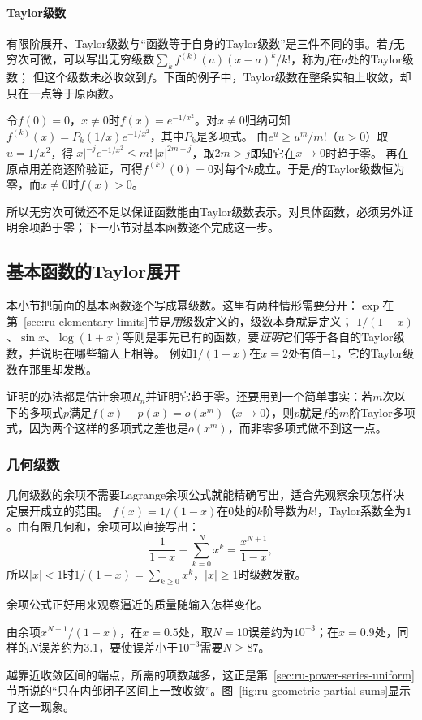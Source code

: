 \paragraph{Taylor级数}
有限阶展开、Taylor级数与“函数等于自身的Taylor级数”是三件不同的事。若$f$无穷次可微，可以写出无穷级数$\sum_kf^{(k)}(a)(x-a)^k/k!$，称为$f$在$a$处的Taylor级数；
但这个级数未必收敛到$f$。下面的例子中，Taylor级数在整条实轴上收敛，却只在一点等于原函数。
\begin{example}[光滑但不等于自身Taylor级数的函数]
\label{ex:ru-smooth-not-analytic}
令$f(0)=0$，$x\neq0$时$f(x)=e^{-1/x^2}$。对$x\neq0$归纳可知$f^{(k)}(x)=P_k(1/x)e^{-1/x^2}$，其中$P_k$是多项式。
由$e^u\geq u^m/m!$（$u>0$）取$u=1/x^2$，得$|x|^{-j}e^{-1/x^2}\leq m!\,|x|^{2m-j}$，取$2m>j$即知它在$x\to0$时趋于零。
再在原点用差商逐阶验证，可得$f^{(k)}(0)=0$对每个$k$成立。于是$f$的Taylor级数恒为零，而$x\neq0$时$f(x)>0$。
\end{example}
所以无穷次可微还不足以保证函数能由Taylor级数表示。对具体函数，必须另外证明余项趋于零；下一小节对基本函数逐个完成这一步。

\subsection{基本函数的Taylor展开}
\label{sec:ru-elementary-taylor}
\label{sec:ru-exp-expansion}

本小节把前面的基本函数逐个写成幂级数。这里有两种情形需要分开：$\exp$在第~\ref{sec:ru-elementary-limits}节是\emph{用}级数定义的，级数本身就是定义；
$1/(1-x)$、$\sin x$、$\log(1+x)$等则是事先已有的函数，要\emph{证明}它们等于各自的Taylor级数，并说明在哪些输入上相等。
例如$1/(1-x)$在$x=2$处有值$-1$，它的Taylor级数在那里却发散。

证明的办法都是估计余项$R_n$并证明它趋于零。还要用到一个简单事实：若$m$次以下的多项式$p$满足$f(x)-p(x)=o(x^m)$（$x\to0$），则$p$就是$f$的$m$阶Taylor多项式，因为两个这样的多项式之差也是$o(x^m)$，而非零多项式做不到这一点。

\subsubsection{几何级数}
\label{sec:ru-taylor-geometric}
几何级数的余项不需要Lagrange余项公式就能精确写出，适合先观察余项怎样决定展开成立的范围。
$f(x)=1/(1-x)$在$0$处的$k$阶导数为$k!$，Taylor系数全为$1$。由有限几何和，余项可以直接写出：
\[
 \frac1{1-x}-\sum_{k=0}^Nx^k=\frac{x^{N+1}}{1-x},
\]
所以$|x|<1$时$1/(1-x)=\sum_{k\geq0}x^k$，$|x|\geq1$时级数发散。

余项公式正好用来观察逼近的质量随输入怎样变化。
\begin{example}[几何级数在不同输入处的截断误差]
\label{ex:ru-geometric-truncation}
由余项$x^{N+1}/(1-x)$，在$x=0.5$处，取$N=10$误差约为$10^{-3}$；在$x=0.9$处，同样的$N$误差约为$3.1$，要使误差小于$10^{-3}$需要$N\geq87$。
\end{example}
越靠近收敛区间的端点，所需的项数越多，这正是第~\ref{sec:ru-power-series-uniform}节所说的“只在内部闭子区间上一致收敛”。图~\ref{fig:ru-geometric-partial-sums}显示了这一现象。

